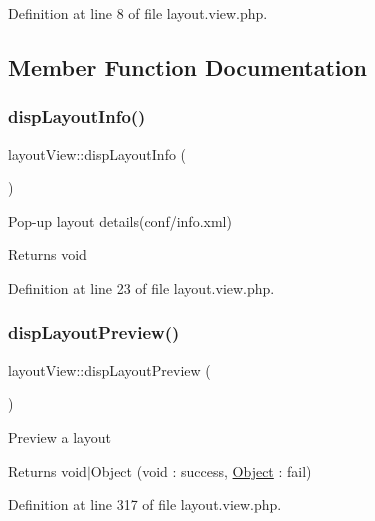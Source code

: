 Definition at line 8 of file layout.\+view.\+php.



\subsection{Member Function Documentation}
\mbox{\label{classlayoutView_a7e82f54644ad872c39e708449b6fea29}} 
\subsubsection{\texorpdfstring{disp\+Layout\+Info()}{dispLayoutInfo()}}
{\footnotesize\ttfamily layout\+View\+::disp\+Layout\+Info (\begin{DoxyParamCaption}{ }\end{DoxyParamCaption})}

Pop-\/up layout details(conf/info.\+xml) \begin{DoxyReturn}{Returns}
void 
\end{DoxyReturn}


Definition at line 23 of file layout.\+view.\+php.

\mbox{\label{classlayoutView_ae61b21bdcf9e655ac2d1dab95ba96519}} 
\subsubsection{\texorpdfstring{disp\+Layout\+Preview()}{dispLayoutPreview()}}
{\footnotesize\ttfamily layout\+View\+::disp\+Layout\+Preview (\begin{DoxyParamCaption}{ }\end{DoxyParamCaption})}

Preview a layout \begin{DoxyReturn}{Returns}
void$\vert$\+Object (void \+: success, \hyperlink{classObject}{Object} \+: fail) 
\end{DoxyReturn}


Definition at line 317 of file layout.\+view.\+php.

\mbox{\label{classlayoutView_a9d6c6bcdcf6ce58534d2f49f3fb89fce}} 
